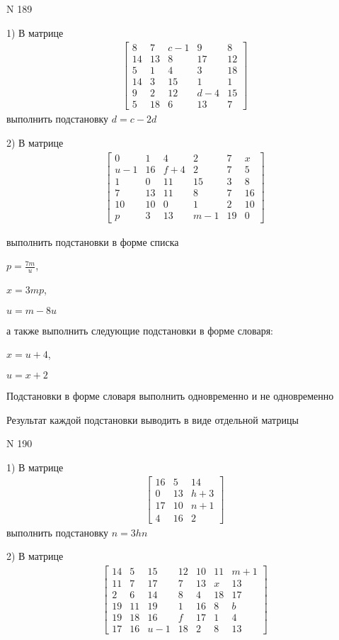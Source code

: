 \documentclass[11pt]{report}
\begin{document}
\newpage
N 189


    1) В матрице
\begin{align*}
\left[\begin{matrix}8 & 7 & c - 1 & 9 & 8\\14 & 13 & 8 & 17 & 12\\5 & 1 & 4 & 3 & 18\\14 & 3 & 15 & 1 & 1\\9 & 2 & 12 & d - 4 & 15\\5 & 18 & 6 & 13 & 7\end{matrix}\right]
\end{align*}
выполнить подстановку $d=c - 2 d$


    2) В матрице
\begin{align*}
\left[\begin{matrix}0 & 1 & 4 & 2 & 7 & x\\u - 1 & 16 & f + 4 & 2 & 7 & 5\\1 & 0 & 11 & 15 & 3 & 8\\7 & 13 & 11 & 8 & 7 & 16\\10 & 10 & 0 & 1 & 2 & 10\\p & 3 & 13 & m - 1 & 19 & 0\end{matrix}\right]
\end{align*}

выполнить подстановки в форме списка

$p=\frac{7 m}{u}$,

$x=3 m p$,

$u=m - 8 u$

а также выполнить следующие подстановки в форме словаря:

$x=u + 4$,

$u=x + 2$


    Подстановки в форме словаря выполнить одновременно и не одновременно


    Результат каждой подстановки выводить в виде отдельной матрицы

\newpage
N 190


    1) В матрице
\begin{align*}
\left[\begin{matrix}16 & 5 & 14\\0 & 13 & h + 3\\17 & 10 & n + 1\\4 & 16 & 2\end{matrix}\right]
\end{align*}
выполнить подстановку $n=3 h n$


    2) В матрице
\begin{align*}
\left[\begin{matrix}14 & 5 & 15 & 12 & 10 & 11 & m + 1\\11 & 7 & 17 & 7 & 13 & x & 13\\2 & 6 & 14 & 8 & 4 & 18 & 17\\19 & 11 & 19 & 1 & 16 & 8 & b\\19 & 18 & 16 & f & 17 & 1 & 4\\17 & 16 & u - 1 & 18 & 2 & 8 & 13\end{matrix}\right]
\end{align*}
\end{document}
